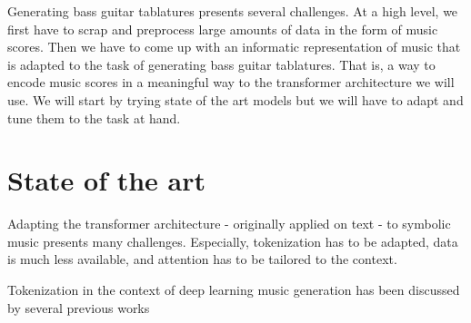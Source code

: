 \documentclass[11pt, a4paper]{article}
\begin{document}
Generating bass guitar tablatures presents several challenges.
At a high level, we first have to scrap and preprocess large amounts of data in the form of music scores.
Then we have to come up with an informatic representation of music that is adapted to the task of generating bass guitar tablatures.
That is, a way to encode music scores in a meaningful way to the transformer architecture we will use.
We will start by trying state of the art models but we will have to adapt and tune them to the task at hand.


\section*{State of the art}

Adapting the transformer architecture - originally applied on text - to symbolic music presents many challenges.
Especially, tokenization has to be adapted, data is much less available, and attention has to be tailored to the context\cite{leNaturalLanguageProcessing2024}.

Tokenization in the context of deep learning music generation has been discussed by several previous works
\cite{agarwalStructureinformedPositionalEncoding2024, makrisConditionalDrumsGeneration2022, sarmentoDadaGPDatasetTokenized2021, hsiaoCompoundWordTransformer2021, cournutEncodagesTablaturesPour2020}






\newpage

\printbibliography%
\end{document}
